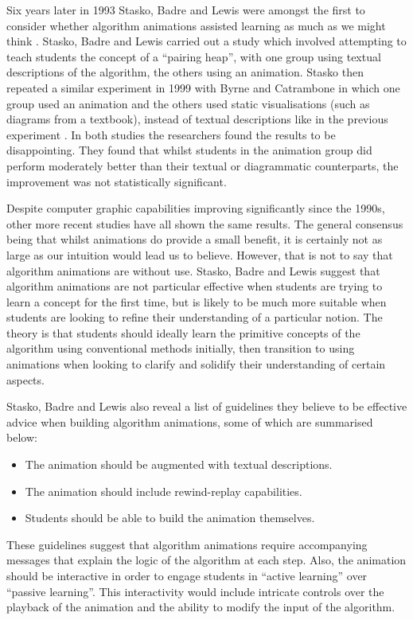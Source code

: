 \documentclass{l4proj}
\begin{document}
Six years later in 1993 Stasko, Badre and Lewis were amongst the first to consider whether algorithm animations assisted learning as much as we might think \cite{StaskoBadreLewis}. Stasko, Badre and Lewis carried out a study which involved attempting to teach students the concept of a ``pairing heap'', with one group using textual descriptions of the algorithm, the others using an animation. Stasko then repeated a similar experiment in 1999 with Byrne and Catrambone in which one group used an animation and the others used static visualisations (such as diagrams from a textbook), instead of textual descriptions like in the previous experiment \cite{StaskoByrneCatrambone}. In both studies the researchers found the results to be disappointing. They found that whilst students in the animation group did perform moderately better than their textual or diagrammatic counterparts, the improvement was not statistically significant.

Despite computer graphic capabilities improving significantly since the 1990s, other more recent studies have all shown the same results. The general consensus being that whilst animations do provide a small benefit, it is certainly not as large as our intuition would lead us to believe. However, that is not to say that algorithm animations are without use. Stasko, Badre and Lewis suggest that algorithm animations are not particular effective when students are trying to learn a concept for the first time, but is likely to be much more suitable when students are looking to refine their understanding of a particular notion. The theory is that students should ideally learn the primitive concepts of the algorithm using conventional methods initially, then transition to using animations when looking to clarify and solidify their understanding of certain aspects.

Stasko, Badre and Lewis also reveal a list of guidelines they believe to be effective advice when building algorithm animations, some of which are summarised below:
\begin{itemize}
\item The animation should be augmented with textual descriptions.
\item The animation should include rewind-replay capabilities.
\item Students should be able to build the animation themselves.
\end{itemize}
These guidelines suggest that algorithm animations require accompanying messages that explain the logic of the algorithm at each step. Also, the animation should be interactive in order to engage students in ``active learning'' over ``passive learning''. This interactivity would include intricate controls over the playback of the animation and the ability to modify the input of the algorithm.
\end{document}
